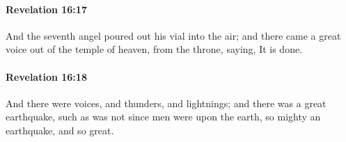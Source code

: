 		\paragraph{Revelation 16:17} %
			\label{REVELATIONNT-16-17}

			And the seventh angel poured out his vial into the air; and there came a great voice out of the temple of heaven, from the throne, saying, It is done.

			\begin{framed}
			\scriptsize
				\begin{compactdesc}
					\item[SBLG] 
				\end{compactdesc}
			\end{framed}

		\paragraph{Revelation 16:18} %
			\label{REVELATIONNT-16-18}

			And there were voices, and thunders, and lightnings; and there was a great earthquake, such as was not since men were upon the earth, so mighty an earthquake, and so great.

